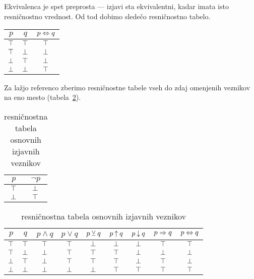 		Ekvivalenca je spet preprosta --- izjavi sta ekvivalentni, kadar imata isto resničnostno vrednost. Od tod dobimo sledečo resničnostno tabelo.
		\begin{center}
			\begin{tabular}{cc|c}
				$p$ & $q$ & $p \Leftrightarrow q$ \\
				\hline
				$\top$ & $\top$ & $\top$ \\
				$\top$ & $\bot$ & $\bot$ \\
				$\bot$ & $\top$ & $\bot$ \\
				$\bot$ & $\bot$ & $\top$
			\end{tabular}
		\end{center}
		
		Za lažjo referenco zberimo resničnostne tabele vseh do zdaj omenjenih veznikov na eno mesto (tabela~\ref{TABELA: resničnostna tabela osnovnih izjavnih veznikov}).
		
		\begin{table}[!ht]
			\centering
			\begin{tabular}{c|c}
				$p$ & $\lnot{p}$ \\
				\hline
				$\top$ & $\bot$ \\
				$\bot$ & $\top$
			\end{tabular}
			\qquad\quad
			\begin{tabular}{cc|ccccccc}
				$p$ & $q$ & $p \land q$ & $p \lor q$ & $p \mathbin{\veebar} q$ & $p \mathbin{\uparrow} q$ & $p \mathbin{\downarrow} q$ & $p \Rightarrow q$ & $p \Leftrightarrow q$ \\
				\hline
				$\top$ & $\top$ & $\top$ & $\top$ & $\bot$ & $\bot$ & $\bot$ & $\top$ & $\top$ \\
				$\top$ & $\bot$ & $\bot$ & $\top$ & $\top$ & $\top$ & $\bot$ & $\bot$ & $\bot$ \\
				$\bot$ & $\top$ & $\bot$ & $\top$ & $\top$ & $\top$ & $\bot$ & $\top$ & $\bot$ \\
				$\bot$ & $\bot$ & $\bot$ & $\bot$ & $\bot$ & $\top$ & $\top$ & $\top$ & $\top$
			\end{tabular}
			\caption{resničnostna tabela osnovnih izjavnih veznikov}\label{TABELA: resničnostna tabela osnovnih izjavnih veznikov}
		\end{table}
		
		
		
		
